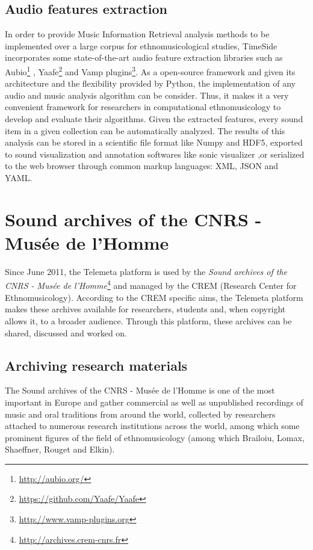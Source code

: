 \documentclass{sig-alternate}
\newcommand{\CREM}{Research Center for Ethnomusicology}
\begin{document}
\subsection{Audio features extraction}
In order to provide Music Information Retrieval analysis methods to be implemented over a large corpus for ethnomusicological studies, TimeSide incorporates some state-of-the-art audio feature extraction libraries such as Aubio\footnote{\url{http://aubio.org/}} \cite{brossierPhD}, Yaafe\footnote{\url{https://github.com/Yaafe/Yaafe}} \cite{yaafe_ISMIR2010} and Vamp plugins\footnote{ \url{http://www.vamp-plugins.org}}.
As a open-source framework and given its architecture and the flexibility provided by Python, the implementation of any audio and music analysis algorithm can be consider. Thus, it makes it a very convenient framework for researchers in computational ethnomusicology to develop and evaluate their algorithms.
Given the extracted features, every sound item in a given collection can be automatically analyzed. The results of this analysis can be stored in a scientific file format like Numpy and HDF5, exported to sound visualization and annotation softwares like sonic visualizer \cite{cannam2006sonic},or serialized to the web browser through common markup languages: XML, JSON and YAML.



\section{Sound archives of the CNRS - Musée de l'Homme}\label{sec:archives-CREM}
Since June 2011, the Telemeta platform is used by the  \emph{Sound archives of the CNRS - Musée de l'Homme}\footnote{\url{http://archives.crem-cnrs.fr}} and managed by the CREM (\CREM). According to the CREM specific aims, the Telemeta platform makes these archives available for researchers, students and, when copyright allows it, to a broader audience. Through this platform, these archives can be shared, discussed and worked on.

\subsection{Archiving research materials}
The Sound archives of the CNRS - Musée de l'Homme is one of the most important in Europe and gather commercial as well as unpublished recordings of music and oral traditions from around the world, collected by researchers attached to numerous research institutions across the world, among which some prominent figures of the field of ethnomusicology (among which Brailoiu, Lomax, Shaeffner, Rouget and Elkin). 
\end{document}
